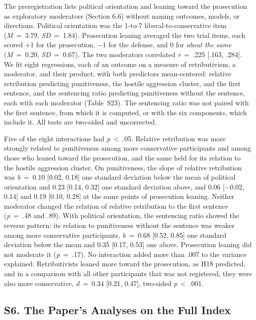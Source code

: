 The preregistration lists political orientation and leaning toward the prosecution as exploratory moderators (Section 6.6) without naming outcomes, models, or directions. Political orientation was the 1-to-7 liberal-to-conservative item (\emph{M}~=~3.79, \emph{SD}~=~1.84). Prosecution leaning averaged the two trial items, each scored +1 for the prosecution, −1 for the defense, and 0 for \emph{about the same} (\emph{M}~=~0.20, \emph{SD}~=~0.67). The two moderators correlated \emph{r}~=~.225 {[}.163, .284{]}. We fit eight regressions, each of an outcome on a measure of retributivism, a moderator, and their product, with both predictors mean-centered: relative retribution predicting punitiveness, the hostile aggression cluster, and the first sentence, and the sentencing ratio predicting punitiveness without the sentence, each with each moderator (Table~S23). The sentencing ratio was not paired with the first sentence, from which it is computed, or with the six components, which include it. All tests are two-sided and uncorrected.

Five of the eight interactions had \emph{p}~\textless{}~.05. Relative retribution was more strongly related to punitiveness among more conservative participants and among those who leaned toward the prosecution, and the same held for its relation to the hostile aggression cluster. On punitiveness, the slope of relative retribution was \emph{b}~=~0.10 {[}0.02, 0.18{]} one standard deviation below the mean of political orientation and 0.23 {[}0.14, 0.32{]} one standard deviation above, and 0.06 {[}−0.02, 0.14{]} and 0.19 {[}0.10, 0.28{]} at the same points of prosecution leaning. Neither moderator changed the relation of relative retribution to the first sentence (\emph{p}~=~.48 and .89). With political orientation, the sentencing ratio showed the reverse pattern: its relation to punitiveness without the sentence was weaker among more conservative participants, \emph{b}~=~0.68 {[}0.52, 0.85{]} one standard deviation below the mean and 0.35 {[}0.17, 0.53{]} one above. Prosecution leaning did not moderate it (\emph{p}~=~.17). No interaction added more than .007 to the variance explained. Retributivists leaned more toward the prosecution, as H18 predicted, and in a comparison with all other participants that was not registered, they were also more conservative, \emph{d}~=~0.34 {[}0.21, 0.47{]}, two-sided \emph{p}~\textless{}~.001.

\subsection{S6. The Paper's Analyses on the Full Index}\label{s6.-the-papers-analyses-on-the-full-index}

